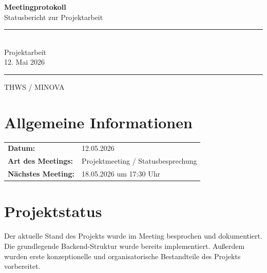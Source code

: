 \documentclass[a4paper,11pt]{article}
\begin{document}

\begin{titlepage}
    \centering
    
    \vspace*{3cm}
    
    {\Huge \textbf{Meetingprotokoll}}\\[0.5cm]
    {\Large Statusbericht zur Projektarbeit}\\[2cm]
    
    \rule{12cm}{0.5pt}\\[0.5cm]
    
    {\Large Projektarbeit}\\[0.3cm]
    {\large 12. Mai 2026}
    
    \rule{12cm}{0.5pt}
    
    \vfill
    
    {\large THWS / MINOVA}\\
    
\end{titlepage}


\tableofcontents
\newpage


\section{Allgemeine Informationen}

\begin{tabular}{ll}
\textbf{Datum:} & 12.05.2026 \\
\textbf{Art des Meetings:} & Projektmeeting / Statusbesprechung \\
\textbf{Nächstes Meeting:} & 18.05.2026 um 17:30 Uhr \\
\end{tabular}

\vspace{1cm}

\section{Projektstatus}

Der aktuelle Stand des Projekts wurde im Meeting besprochen und dokumentiert. 
Die grundlegende Backend-Struktur wurde bereits implementiert. 
Außerdem wurden erste konzeptionelle und organisatorische Bestandteile des Projekts vorbereitet.
\end{document}
